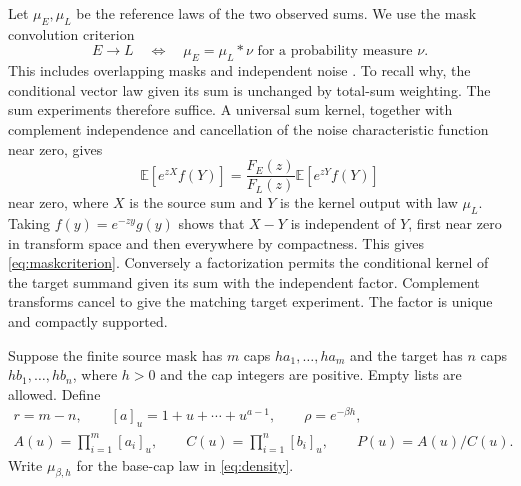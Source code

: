 \documentclass[11pt,a4paper]{article}
\theoremstyle{remark}\newtheorem*{ednote}{Editorial note (ProveIt, 2026-10-01)}
\newcommand{\E}{\mathbb E}\newcommand{\R}{\mathbb R}\newcommand{\C}{\mathbb C}\newcommand{\N}{\mathbb N}
\begin{document}
Let $\mu_E,\mu_L$ be the reference laws of the two observed sums. We use the mask convolution criterion
\begin{equation}\label{eq:maskcriterion}
 E\longrightarrow L
 \quad\Longleftrightarrow\quad
 \mu_E=\mu_L*\nu\text{ for a probability measure }\nu.
\end{equation}
This includes overlapping masks and independent noise \cite{Masks}. To recall why, the conditional vector law given its sum is unchanged by total-sum weighting. The sum experiments therefore suffice. A universal sum kernel, together with complement independence and cancellation of the noise characteristic function near zero, gives
\[
 \E[e^{zX}f(Y)]=\frac{F_E(z)}{F_L(z)}\E[e^{zY}f(Y)]
\]
near zero, where $X$ is the source sum and $Y$ is the kernel output with law $\mu_L$. Taking $f(y)=e^{-zy}g(y)$ shows that $X-Y$ is independent of $Y$, first near zero in transform space and then everywhere by compactness. This gives \eqref{eq:maskcriterion}. Conversely a factorization permits the conditional kernel of the target summand given its sum with the independent factor. Complement transforms cancel to give the matching target experiment. The factor is unique and compactly supported.

Suppose the finite source mask has $m$ caps $ha_1,\ldots,ha_m$ and the target has $n$ caps $hb_1,\ldots,hb_n$, where $h>0$ and the cap integers are positive. Empty lists are allowed. Define
\begin{equation}\label{eq:notation}
 \begin{gathered}
 r=m-n,\qquad [a]_u=1+u+\cdots+u^{a-1},\qquad \rho=e^{-\beta h},\\
 A(u)=\prod_{i=1}^m[a_i]_u,\qquad
 C(u)=\prod_{i=1}^n[b_i]_u,\qquad P(u)=A(u)/C(u).
 \end{gathered}
\end{equation}
Write $\mu_{\beta,h}$ for the base-cap law in \eqref{eq:density}.
\end{document}
